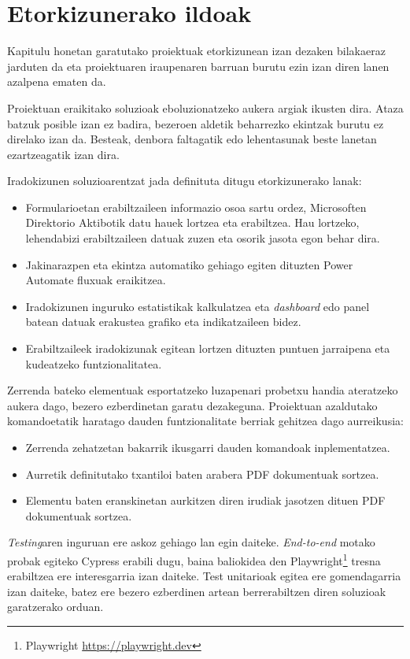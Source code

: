\chapter{Etorkizunerako ildoak}


     Kapitulu honetan garatutako proiektuak etorkizunean izan dezaken bilakaeraz jarduten da eta proiektuaren iraupenaren barruan burutu ezin izan diren lanen azalpena ematen da.


Proiektuan eraikitako soluzioak eboluzionatzeko aukera argiak ikusten dira. Ataza batzuk posible izan ez badira, bezeroen aldetik beharrezko ekintzak burutu ez direlako izan da. Besteak, denbora faltagatik edo lehentasunak beste lanetan ezartzeagatik izan dira. 

Iradokizunen soluzioarentzat jada definituta ditugu etorkizunerako lanak:
\begin{itemize}
    \item Formularioetan erabiltzaileen informazio osoa sartu ordez, Microsoften Direktorio Aktibotik datu hauek lortzea eta erabiltzea. Hau lortzeko, lehendabizi erabiltzaileen datuak zuzen eta osorik jasota egon behar dira.  
    \item Jakinarazpen eta ekintza automatiko gehiago egiten dituzten Power Automate fluxuak eraikitzea. 
    \item Iradokizunen inguruko estatistikak kalkulatzea eta \textit{dashboard} edo panel batean datuak erakustea grafiko eta indikatzaileen bidez.
    \item Erabiltzaileek iradokizunak egitean lortzen dituzten puntuen jarraipena eta kudeatzeko funtzionalitatea. 
\end{itemize}

Zerrenda bateko elementuak esportatzeko luzapenari probetxu handia ateratzeko aukera dago, bezero ezberdinetan garatu dezakeguna. Proiektuan azaldutako komandoetatik haratago dauden funtzionalitate berriak gehitzea dago aurreikusia: 
\begin{itemize}
    \item Zerrenda zehatzetan bakarrik ikusgarri dauden komandoak inplementatzea.
    \item Aurretik definitutako txantiloi baten arabera PDF dokumentuak sortzea.  
    \item Elementu baten eranskinetan aurkitzen diren irudiak jasotzen dituen PDF dokumentuak sortzea. 
\end{itemize}

\textit{Testing}aren inguruan ere askoz gehiago lan egin daiteke. \textit{End-to-end} motako probak egiteko Cypress erabili dugu, baina baliokidea den Playwright\footnote{Playwright \url{https://playwright.dev}} tresna erabiltzea ere interesgarria izan daiteke. Test unitarioak egitea ere gomendagarria izan daiteke,  batez ere bezero ezberdinen artean berrerabiltzen diren soluzioak garatzerako orduan.